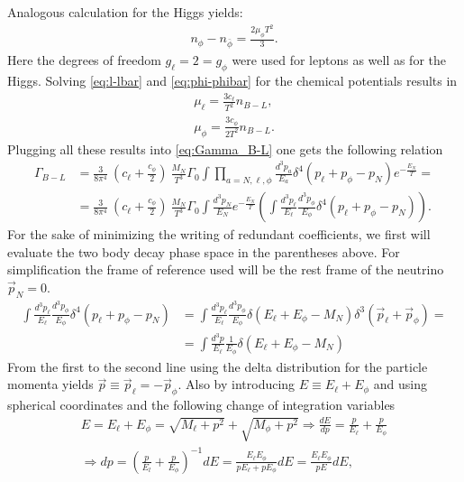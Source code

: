Analogous calculation for the Higgs yields:
\begin{align*}
	n_\phi-n_{\bar{\phi}}=\frac{2\mu_\phi T^2}{3}.
\end{align*}
Here the degrees of freedom $g_\ell=2= g_\phi$ were used for leptons as well as for the Higgs. \newline\indent
Solving \eqref{eq:l-lbar} and \eqref{eq:phi-phibar} for the chemical potentials results in
\begin{align*}
	\mu_\ell=\frac{3c_\ell}{T^2}n_{B-L},\\
	\mu_\phi=\frac{3c_\phi}{2T^2}n_{B-L}.
\end{align*}
Plugging all these results into \eqref{eq:Gamma_B-L} one gets the following relation
\begin{align*}
	\Gamma_{B-L}&=\frac{3}{8\pi^4}\:\left(c_\ell+\frac{c_\phi}{2}\right)\:\frac{M_N}{T^3}\Gamma_0\int\prod_{a=N,\ell,\phi}\frac{d^3p_a}{E_a}\delta^4\left(p_\ell+p_\phi-p_N\right)e^{-\frac{E_N}{T}}=\\
	&=\frac{3}{8\pi^4}\:\left(c_\ell+\frac{c_\phi}{2}\right)\:\frac{M_N}{T^3}\Gamma_0\int \frac{d^3p_N}{E_N}e^{-\frac{E_N}{T}}\left(\int\frac{d^3p_\ell}{E_\ell}\frac{d^3p_\phi}{E_\phi}\delta^4\left(p_\ell+p_\phi-p_N\right)\right).
\end{align*}
For the sake of minimizing the writing of redundant coefficients, we first will evaluate the two body decay phase space in the parentheses above. For simplification the frame of reference used will be the rest frame of the neutrino $\vec{p}_N=0$.
\begin{align*}
\int\frac{d^3p_\ell}{E_\ell}\frac{d^3p_\phi}{E_\phi}\delta^4\left(p_\ell+p_\phi-p_N\right)&=\int\frac{d^3p_\ell}{E_\ell}\frac{d^3p_\phi}{E_\phi}\delta\left(E_\ell+E_\phi-M_N\right)\delta^3\left(\vec{p}_\ell+\vec{p}_\phi\right)=\\
&=\int\frac{d^3p}{E_\ell}\frac{1}{E_\phi}\delta\left(E_\ell+E_\phi-M_N\right)
\end{align*}
From the first to the second line using the delta distribution for the particle momenta yields $\vec{p}\equiv\vec{p}_\ell=-\vec{p}_\phi$. Also by introducing $E \equiv E_\ell+E_\phi$ and using spherical coordinates and the following change of integration variables
\begin{align*}
	E=E_\ell+E_\phi=\sqrt{M_\ell+p^2}+\sqrt{M_\phi+p^2} \Longrightarrow \frac{dE}{dp}=\frac{p}{E_\ell}+\frac{p}{E_\phi} \\
	\Longrightarrow dp=\left(\frac{p}{E_l}+\frac{p}{E_\phi}\right)^{-1}dE=\frac{E_\ell E_\phi}{pE_\ell+pE_\phi}dE=\frac{E_\ell E_\phi}{pE}dE,
\end{align*}
